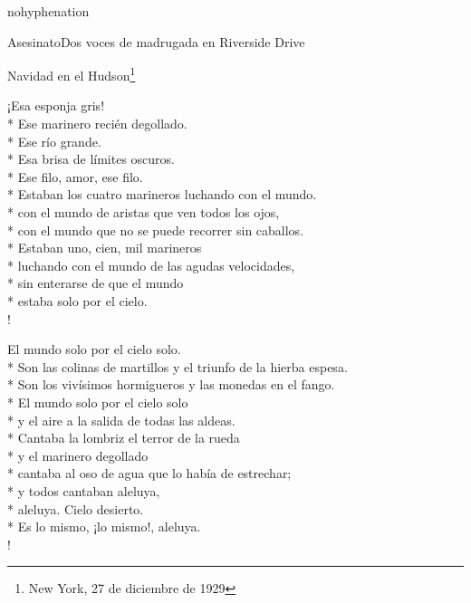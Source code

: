 \documentclass[
    a5paper,
    DIV=10,
    12pt,
    notitlepage,
    oneside,]
{scrbook} %
\begin{document}
\begin{hyphenrules}{nohyphenation}
\begin{poem}{Asesinato}{Dos voces de madrugada en Riverside Drive}{}
\end{poem}

\begin{poem}{Navidad en el Hudson}{\footnote{New York, 27 de diciembre de 1929}}{\vspace{-1em}}

¡Esa esponja gris!\\*
Ese marinero recién degollado.\\*
Ese río grande.\\*
Esa brisa de límites oscuros.\\*
Ese filo, amor, ese filo.\\*
Estaban los cuatro marineros luchando con el mundo.\\*
con el mundo de aristas que ven todos los ojos,\\*
con el mundo que no se puede recorrer sin caballos.\\*
Estaban uno, cien, mil marineros\\*
luchando con el mundo de las agudas velocidades,\\*
sin enterarse de que el mundo\\*
estaba solo por el cielo.\\!

El mundo solo por el cielo solo.\\*
Son las colinas de martillos y el triunfo de la hierba espesa.\\*
Son los vivísimos hormigueros y las monedas en el fango.\\*
El mundo solo por el cielo solo\\*
y el aire a la salida de todas las aldeas.\\*
Cantaba la lombriz el terror de la rueda\\*
y el marinero degollado\\*
cantaba al oso de agua que lo había de estrechar;\\*
y todos cantaban aleluya,\\*
aleluya. Cielo desierto.\\*
Es lo mismo, ¡lo mismo!, aleluya.\\!


\end{poem}
\end{hyphenrules}
\end{document}
